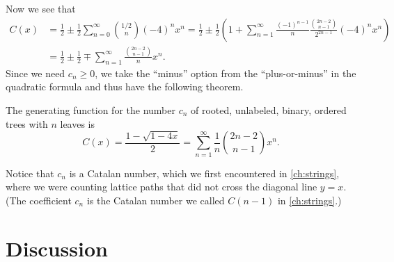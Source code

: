 Now we see that
\begin{align*}
  C(x) &= \frac{1}{2} \pm \frac{1}{2} \sum_{n=0}^\infty\binom{1/2}{n}
  (-4)^n x^n 
  = \frac{1}{2} \pm \frac{1}{2}\left(1+ \sum_{n=1}^\infty
\frac{(-1)^{n-1}}{n}\frac{\binom{2n-2}{n-1}}{2^{2n-1}}(-4)^n
x^n\right)\\
&=
\frac{1}{2} \pm\frac{1}{2} \mp\sum_{n=1}^\infty \frac{\binom{2n-2}{n-1}}{n} x^n.
\end{align*}
Since we need $c_n\geq 0$, we take the ``minus'' option from the
``plus-or-minus'' in the quadratic formula and thus have the following
theorem.

\begin{theorem}\label{thm:catalan-genfunction}
  The generating function for the number $c_n$ of rooted, unlabeled,
  binary, ordered trees with $n$ leaves is
  \[C(x) = \frac{1-\sqrt{1-4x}}{2} = \sum_{n=1}^\infty \frac{1}{n}\binom{2n-2}{n-1}x^n.\]
\end{theorem}

Notice that $c_n$ is a Catalan number, which we first encountered in
\autoref{ch:strings}, where we were counting lattice paths that did
not cross the diagonal line $y=x$. (The coefficient $c_n$ is the
Catalan number we called $C(n-1)$ in \autoref{ch:strings}.)






\section{Discussion}

